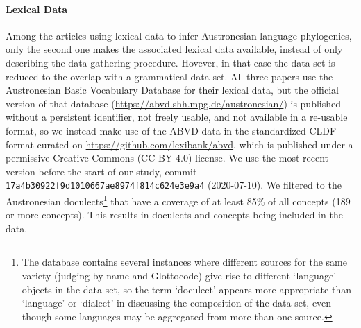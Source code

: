 \documentclass[]{rsos}%
\begin{document}
\paragraph{Lexical Data}
Among the articles using lexical data to infer Austronesian language phylogenies, only the second one
\parencite{greenhill2018population} makes the associated lexical data available, instead of only describing the data gathering procedure.
Hovever, in that case the data set is reduced to the overlap with a grammatical data set.
All three papers use the Austronesian Basic Vocabulary Database for their lexical data, but the official version of that database
(\url{https://abvd.shh.mpg.de/austronesian/}) is published without a persistent identifier, not freely usable, and not available in a re-usable format, so we instead make use of the ABVD
data in the standardized CLDF format \parencite{cldf} curated on \url{https://github.com/lexibank/abvd}, which is published under a
permissive Creative Commons (CC-BY-4.0) license. We use the most recent version before the start of our study, commit \texttt{17a4b30922f9d1010667ae8974f814c624e3e9a4}
(2020-07-10). We filtered to the Austronesian doculects\footnote{The database contains several instances where different
sources for the same variety (judging by name and Glottocode) give rise to different ‘language’ objects in the data set, so the term
‘doculect’ appears more appropriate than ‘language’ or ‘dialect’ in discussing the composition of the data set, even though some languages may be aggregated from more than one source.} that have a coverage
of at least 85\% of all concepts (189 or more concepts). This results in \countlects{} doculects and \countconcepts{} concepts being included in the data.
\end{document}
